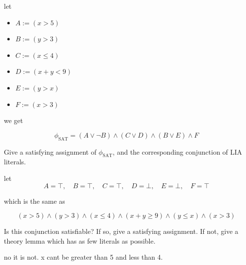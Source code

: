 \documentclass[11pt]{article}
\begin{document}
\begin{qunlist}
\begin{qparts}
    \begin{answer}

      let
      \begin{itemize}
        \item $A := (x > 5)$

        \item $B := (y > 3)$

        \item $C := (x \le 4)$

        \item $D := (x + y < 9)$

        \item $E := (y > x)$

        \item $F := (x > 3)$
      \end{itemize}

      we get

      \begin{equation}
        \phi_{\text{SAT}} = (A \lor \lnot B) \land (C \lor D) \land (B \lor E) \land F
      \end{equation}

    \end{answer}

  \item
    Give a satisfying assignment of $\phi_{\text{SAT}}$, and the corresponding conjunction of LIA literals.

    \begin{answer}

      let
      \begin{equation}
        A = \top, \quad B = \top, \quad C = \top, \quad D = \bot, \quad E = \bot, \quad F = \top
      \end{equation}

      which is the same as

      \begin{equation}
        (x > 5) \land (y > 3) \land (x \le 4) \land (x + y \ge 9) \land (y \le x) \land (x > 3)
      \end{equation}

    \end{answer}

  \item
    Is this conjunction satisfiable?
    If so, give a satisfying assignment.
    If not, give a theory lemma which has as few literals as possible.

    \begin{answer}
      no it is not. x cant be greater than 5 and less than 4.


\end{answer}
\end{qparts}
\end{qunlist}
\end{document}
